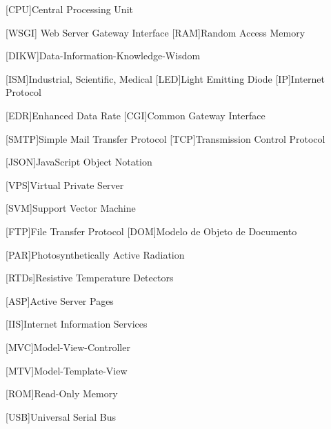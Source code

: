 \begin{multicols}{2}
\begin{acronym}[RELAX NG]
	[CPU]{Central Processing Unit}
	
	[WSGI]{ Web Server Gateway Interface }
	[RAM]{Random Access Memory}
	
	[DIKW]{Data-Information-Knowledge-Wisdom}
	
	[ISM]{Industrial, Scientific, Medical}
	[LED]{Light Emitting Diode}
	[IP]{Internet Protocol}
	
	[EDR]{Enhanced Data Rate}
	[CGI]{Common Gateway Interface}
	
	[SMTP]{Simple Mail Transfer Protocol}
	[TCP]{Transmission Control Protocol}
	
	[JSON]{JavaScript Object Notation}
	
	[VPS]{Virtual Private Server }
	
	[SVM]{Support Vector Machine}
	
	[FTP]{File Transfer Protocol}
	[DOM]{Modelo de Objeto de Documento}
	
	[PAR]{Photosynthetically Active Radiation}
	
	[RTDs]{Resistive Temperature Detectors}
	
	[ASP]{Active Server Pages}
	
	
	[IIS]{Internet Information Services}
	
	[MVC]{Model-View-Controller}
	
	[MTV]{Model-Template-View}
	
	[ROM]{Read-Only Memory}
	
	[USB]{Universal Serial Bus}
	
\end{acronym}

\end{multicols}


